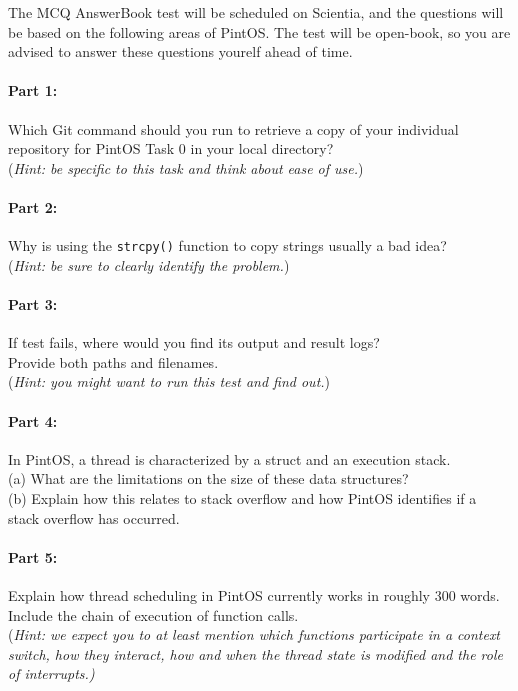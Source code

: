 \documentclass[a4paper,11pt]{article}
\begin{document}
The MCQ AnswerBook test will be scheduled on Scientia, and the questions will be based on the following areas of PintOS.
The test will be open-book, so you are advised to answer these questions yourelf ahead of time.

\paragraph{Part 1:}
Which Git command should you run to retrieve a copy of your individual repository for PintOS Task 0 in your local directory? \\
(\textit{Hint: be specific to this task and think about ease of use.})

\paragraph{Part 2:}
Why is using the {\tt strcpy()} function to copy strings usually a bad idea? \\
(\textit{Hint: be sure to clearly identify the problem.})

\paragraph{Part 3:}
If test  fails, where would you find its output and result logs? \\
Provide both paths and filenames. \\
(\textit{Hint: you might want to run this test and find out.}) 
 
\paragraph{Part 4:}
In PintOS, a thread is characterized by a struct and an execution stack. \\
(a) What are the limitations on the size of these data structures? \\
(b) Explain how this relates to stack overflow and how PintOS identifies if a stack overflow has occurred.

\paragraph{Part 5:}
Explain how thread scheduling in PintOS currently works in roughly 300 words.
Include the chain of execution of function calls. \\
(\textit{Hint: we expect you to at least mention which functions participate in a context switch, how they interact, how and when the thread state is modified and the role of interrupts.)}
\end{document}
